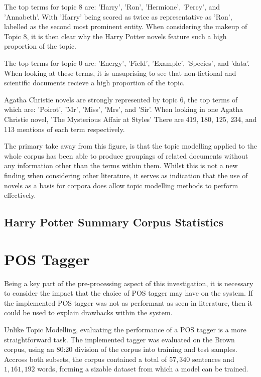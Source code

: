 \documentclass[10pt]{report}
\begin{document}
The top terms for topic 8 are: 'Harry', 'Ron', 'Hermione', 'Percy', and 'Annabeth'. With 'Harry' being scored as twice as representative as 'Ron', labelled as the second most prominent entity. When considering the makeup of Topic 8, it is then clear why the Harry Potter novels feature such a high proportion of the topic.

The top terms for topic 0 are: 'Energy', 'Field', 'Example', 'Species', and 'data'. When looking at these terms, it is unsuprising to see that non-fictional and scientific documents recieve a high proportion of the topic.

Agatha Christie novels are strongly represented by topic 6, the top terms of which are: 'Poirot', 'Mr', 'Miss', 'Mrs', and 'Sir'. When looking in one Agatha Christie novel, 'The Mysterious Affair at Styles' There are 419, 180, 125, 234, and 113 mentions of each term respectively.

The primary take away from this figure, is that the topic modelling applied to the whole corpus has been able to produce groupings of related documents without any information other than the terms within them. Whilst this is not a new finding when considering other literature, it serves as indication that the use of novels as a basis for corpora does allow topic modelling methods to perform effectively.


\clearpage
\subsection{Harry Potter Summary Corpus Statistics}



\clearpage
\section{POS Tagger}
Being a key part of the pre-processing aspect of this investigation, it is necessary to consider the impact that the choice of POS tagger may have on the system. If the implemented POS tagger was not as performant as seen in literature, then it could be used to explain drawbacks within the system.

Unlike Topic Modelling, evaluating the performance of a POS tagger is a more straightforward task. The implemented tagger was evaluated on the Brown corpus, using an 80:20 division of the corpus into training and test samples. Accross both subsets, the corpus contained a total of $57,340$ sentences and $1,161,192$ words, forming a sizable dataset from which a model can be trained.
\end{document}
